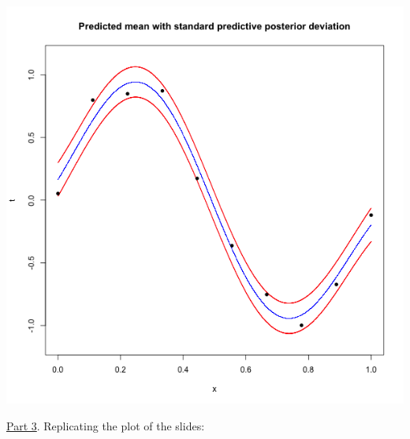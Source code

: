 \documentclass[a4paper, 11pt]{article}\usepackage[]{graphicx}\usepackage[]{color}
\begin{document}
\begin{center}
\includegraphics[scale=0.6]{ps2_plot3.png}
\end{center}
\underline{Part 3}. Replicating the plot of the slides:
\end{document}
